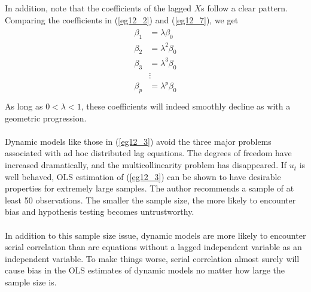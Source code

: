 \documentclass[11pt]{article}
\begin{document}
In addition, note that the coefficients of the lagged $X$s follow a clear pattern. Comparing the coefficients in (\ref{eg12_2}) and (\ref{eg12_7}), we get
\begin{align}
\label{eg12_8}
\begin{split}
\beta_1 &= \lambda \beta_0\\
\beta_2 &= \lambda^2 \beta_0\\
\beta_3 &= \lambda^3 \beta_0\\
&\vdots\\
\beta_p &= \lambda^p \beta_0\\
\end{split}
\end{align}
As long as $0<\lambda<1$, these coefficients will indeed smoothly decline as with a geometric progression.\\ \\
Dynamic models like those in (\ref{eg12_3}) avoid the three major problems associated with ad hoc distributed lag equations. The degrees of freedom have increased dramatically, and the multicollinearity problem has disappeared. If $u_t$ is well behaved, OLS estimation of (\ref{eg12_3}) can be shown to have desirable properties for extremely large samples. The author recommends a sample of at least 50 observations. The smaller the sample size, the more likely to encounter bias and hypothesis testing becomes untrustworthy.\\ \\
In addition to this sample size issue, dynamic models are more likely to encounter serial correlation than are equations without a lagged independent variable as an independent variable. To make things worse, serial correlation almost surely will cause bias in the OLS estimates of dynamic models no matter how large the sample size is.
\end{document}
